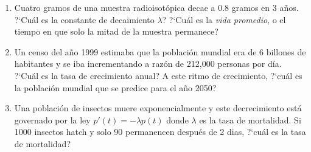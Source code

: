 \documentclass[letterpaper]{article}
\theoremstyle{definition}
\theoremstyle{lemathm}
\theoremstyle{lemathm}
\theoremstyle{lemathm}
\theoremstyle{lemademthm}
\newcommand{\1}{\mathbbm{1}}
\begin{document}
\begin{enumerate}
		\item Cuatro gramos de una muestra radioisot\'opica decae a 0.8 gramos en 3 años. ?`Cu\'al es la constante de decaimiento $\lambda$? ?`Cu\'al es la \emph{vida promedio}, o el tiempo en que solo la mitad de la muestra permanece?
		
		\item Un censo del año 1999 estimaba que la poblaci\'on mundial era de 6 billones de habitantes y se iba incrementando a raz\'on de 212,000 personas por d\'ia. ?`Cu\'al es la tasa de crecimiento anual? A este ritmo de crecimiento, ?`cu\'al es la poblaci\'on mundial que se predice para el año 2050?
		
		\item Una poblaci\'on de insectos muere exponencialmente y este decrecimiento est\'a governado por la ley $p'(t)=-\lambda p(t)$ donde $\lambda$ es la tasa de mortalidad. Si 1000 insectos hatch y solo 90 permanencen despu\'es de 2 dias, ?`cu\'al es la tasa de mortalidad? 		
	
		\end{enumerate}
\end{document}
